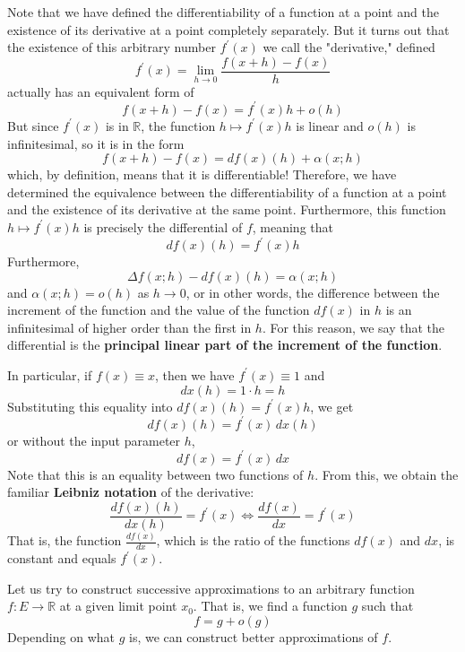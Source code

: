   Note that we have defined the differentiability of a function at a point and the existence of its derivative at a point completely separately. But it turns out that the existence of this arbitrary number $f^\prime (x)$ we call the "derivative," defined
  \[f^\prime (x) = \lim_{h \rightarrow 0} \frac{f(x + h) - f(x)}{h}\]
  actually has an equivalent form of 
  \[f(x + h) - f(x) = f^\prime (x) h + o(h)\]
  But since $f^\prime(x)$ is in $\mathbb{R}$, the function $h \mapsto f^\prime (x) h$ is linear and $o(h)$ is infinitesimal, so it is in the form 
  \[f(x + h) - f(x) = df (x) (h) + \alpha(x; h)\]
  which, by definition, means that it is differentiable! Therefore, we have determined the equivalence between the differentiability of a function at a point and the existence of its derivative at the same point. Furthermore, this function $h \mapsto f^\prime (x) h$ is precisely the differential of $f$, meaning that
  \[df (x) (h) = f^\prime (x) h\]
  Furthermore, 
  \[\Delta f(x; h) - df(x)(h) = \alpha (x; h)\]
  and $\alpha(x;h) = o (h)$ as $h \rightarrow 0$, or in other words, the difference between the increment of the function and the value of the function $df(x)$ in $h$ is an infinitesimal of higher order than the first in $h$. For this reason, we say that the differential is the \textbf{principal linear part of the increment of the function}. 

  In particular, if $f(x) \equiv x$, then we have $f^\prime (x) \equiv 1$ and 
  \[dx (h) = 1 \cdot h = h\]
  Substituting this equality into $df(x) (h) = f^\prime (x) h$, we get
  \[df (x) (h) = f^\prime (x) \,dx (h)\]
  or without the input parameter $h$, 
  \[df(x) = f^\prime (x) \,dx\]
  Note that this is an equality between two functions of $h$. From this, we obtain the familiar \textbf{Leibniz notation} of the derivative: 
  \[\frac{df (x) (h)}{dx(h)} = f^\prime (x) \iff \frac{df(x)}{dx} = f^\prime (x)\]
  That is, the function $\frac{df(x)}{dx}$, which is the ratio of the functions $df(x)$ and $dx$, is constant and equals $f^\prime (x)$. 

  Let us try to construct successive approximations to an arbitrary function $f: E \longrightarrow \mathbb{R}$ at a given limit point $x_0$. That is, we find a function $g$ such that
  \[f = g + o(g)\]
  Depending on what $g$ is, we can construct better approximations of $f$. 

